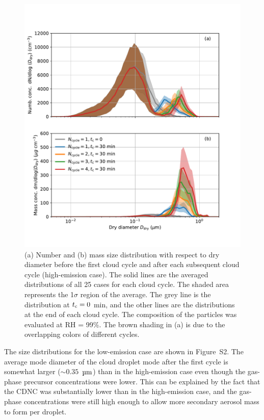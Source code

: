 \documentclass[edeposit,fullpage]{uiucthesis2009}
\begin{document}
\begin{figure}
    \centering
    \includegraphics[scale=0.45]{chap3_figs/fig5.pdf}
    \caption{(a) Number and (b) mass size distribution with respect to
      dry diameter before the first cloud cycle and after each
      subsequent cloud cycle (high-emission case). The solid
      lines are the averaged distributions of all 25 cases for each
      cloud cycle. The shaded area represents the 1$\sigma$ region of
      the average. The grey line is the distribution at $t_{\rm c}= 0$
      min, and the other lines are the distributions at the end of
      each cloud cycle. The composition of the particles was evaluated
      at RH = 99\%. The brown shading in (a) is due to the
        overlapping colors of different cycles.}
    \label{fig:size_number}
\end{figure}

The size distributions for the low-emission case are shown in
  Figure~S2. The average mode diameter of the cloud droplet mode after
  the first cycle is somewhat larger ($\sim0.35$~$\rm \mu m$) than in the
  high-emission case even though the gas-phase precursor
  concentrations were lower. This can be explained by the fact that
  the CDNC was substantially lower than in the high-emission case, and
  the gas-phase concentrations were still high enough to allow more
  secondary aerosol mass to form per droplet.
\end{document}
